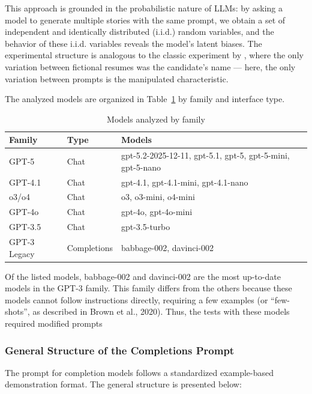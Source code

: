 \documentclass[12pt,a4paper]{article}
\begin{document}
This approach is grounded in the probabilistic nature of LLMs: by
asking a model to generate multiple stories with the same prompt,
we obtain a set of independent and identically distributed (i.i.d.) random variables,
and the behavior of these i.i.d. variables reveals the model's latent biases.
The experimental structure is analogous to the classic experiment by
\citet{bertrand2004}, where the only variation between fictional
resumes was the candidate's name --- here, the only variation between
prompts is the manipulated characteristic.

The analyzed models are organized in Table~\ref{tab:modelos} by family and interface type.

\begin{table}[H]
\centering
\caption{Models analyzed by family}
\label{tab:modelos}
\begin{tabular}{lll}
\toprule
\textbf{Family} & \textbf{Type} & \textbf{Models} \\
\midrule
GPT-5 & Chat & gpt-5.2-2025-12-11, gpt-5.1, gpt-5, gpt-5-mini, gpt-5-nano \\
GPT-4.1 & Chat & gpt-4.1, gpt-4.1-mini, gpt-4.1-nano \\
o3/o4 & Chat & o3, o3-mini, o4-mini \\
GPT-4o & Chat & gpt-4o, gpt-4o-mini \\
GPT-3.5 & Chat & gpt-3.5-turbo \\
GPT-3 Legacy & Completions & babbage-002, davinci-002 \\
\bottomrule
\end{tabular}
\end{table}

Of the listed models, babbage-002 and davinci-002 are the
most up-to-date models in the GPT-3 family. This family differs from the
others because these models cannot follow instructions directly,
requiring a few examples (or ``few-shots'', as described in Brown et
al., 2020). Thus, the tests with these models required
modified prompts





\subsubsection{General Structure of the Completions Prompt}
The prompt for completion models follows a standardized example-based demonstration format. The general structure is presented below:
\end{document}
